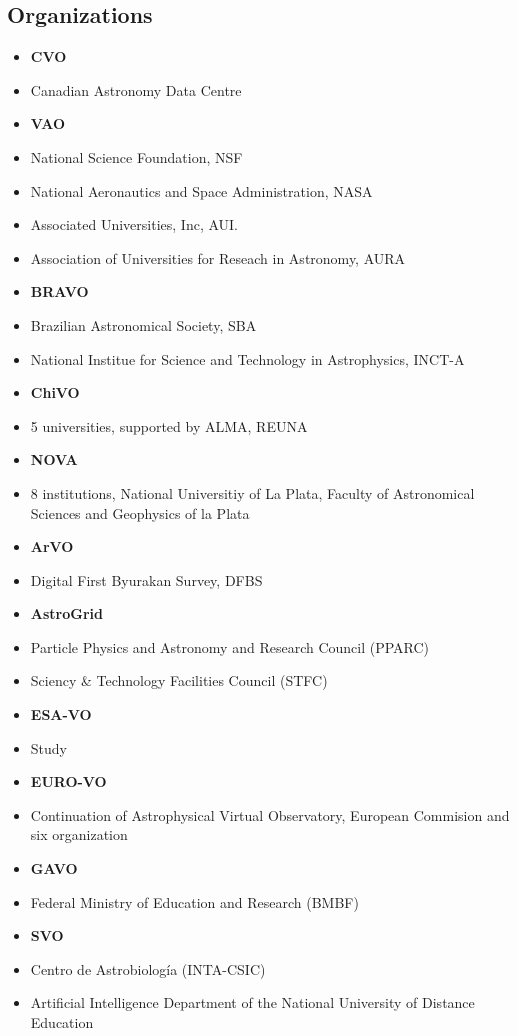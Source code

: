 \subsection{Organizations}
\begin{itemize}
	\item \textbf{CVO}
	\item Canadian Astronomy Data Centre
	\item \textbf{VAO}
	\item National Science Foundation, NSF
	\item National Aeronautics and Space Administration, NASA 
	\item Associated Universities, Inc, AUI.
	\item Association of Universities for Reseach in Astronomy, AURA
	\item \textbf{BRAVO}
	\item Brazilian Astronomical Society, SBA
	\item National Institue for Science and Technology in Astrophysics, INCT-A
	\item \textbf{ChiVO}
	\item 5 universities, supported by ALMA, REUNA
	\item \textbf{NOVA}
	\item 8 institutions, National Universitiy of La Plata, Faculty of Astronomical 
		Sciences and Geophysics of la Plata
	\item \textbf{ArVO}
	\item Digital First Byurakan Survey, DFBS
	\item \textbf{AstroGrid}
	\item Particle Physics and Astronomy and Research Council  (PPARC)
	\item Sciency \& Technology Facilities Council (STFC)
	\item \textbf{ESA-VO}
	\item Study
	\item \textbf{EURO-VO}
	\item Continuation of Astrophysical Virtual Observatory, European Commision and six organization
	\item \textbf{GAVO}
	\item Federal Ministry of Education and Research (BMBF)
	\item \textbf{SVO}
	\item Centro de Astrobiología (INTA-CSIC)
	\item Artificial Intelligence Department of the National University of Distance Education

\end{itemize}
